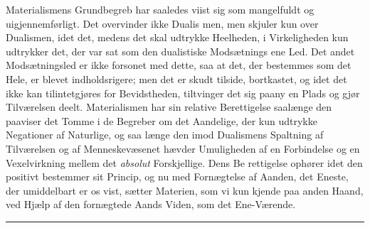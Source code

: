 \documentclass[12pt,a4paper]{book}
\newcommand{\divrule}{\begin{center}\rule{2cm}{0.4pt}\end{center}}
\begin{document}
Materialismens Grundbegreb har saaledes viist sig som
mangelfuldt og uigjennemførligt. Det overvinder ikke Dualis\-%
men, men skjuler kun over Dualismen, idet det, medens det
skal udtrykke Heelheden, i Virkeligheden kun udtrykker det,
der var sat som den dualistiske Modsætnings ene Led. Det
andet Modsætningsled er ikke forsonet med dette, saa at det,
der bestemmes som det Hele, er blevet indholdsrigere; men det
er skudt tilside, bortkastet, og idet det ikke kan tilintetgjøres
for Bevidstheden, tiltvinger det sig paany en Plads og gjør
Tilværelsen deelt. Materialismen har sin relative Berettigelse
saalænge den paaviser det Tomme i de Begreber om det
Aandelige, der kun udtrykke Negationer af Naturlige, og saa\-%
%
længe den imod Dualismens Spaltning af Tilværelsen og af
Menneskevæsenet hævder Umuligheden af en Forbindelse og
en Vexelvirkning mellem det \emph{absolut} Forskjellige. Dens Be\-%
rettigelse ophører idet den positivt bestemmer sit Princip, og
nu med Fornægtelse af Aanden, det Eneste, der umiddelbart
er os vist, sætter Materien, som vi kun kjende paa anden
Haand, ved Hjælp af den fornægtede Aands Viden, som det
Ene-Værende.

\divrule
\end{document}

